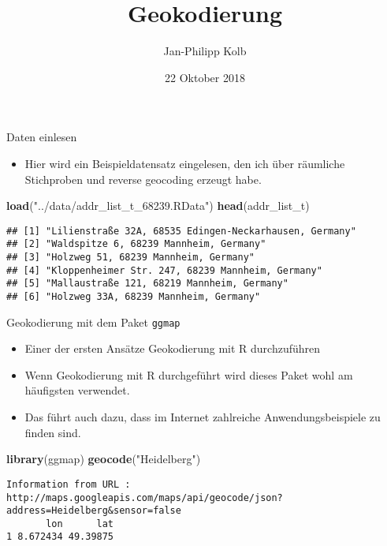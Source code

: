 \documentclass[ignorenonframetext,]{beamer}
\title{Geokodierung}
\author{Jan-Philipp Kolb}
\date{22 Oktober 2018}
\newenvironment{Shaded}{\begin{snugshade}}{\end{snugshade}}
\newcommand{\KeywordTok}[1]{\textcolor[rgb]{0.13,0.29,0.53}{\textbf{#1}}}
\newcommand{\NormalTok}[1]{#1}
\newcommand{\StringTok}[1]{\textcolor[rgb]{0.31,0.60,0.02}{#1}}
\providecommand{\tightlist}{%
  \setlength{\itemsep}{0pt}\setlength{\parskip}{0pt}}
\begin{document}
\frame{\titlepage}

\begin{frame}[fragile]{Daten einlesen}
\protect\hypertarget{daten-einlesen}{}

\begin{itemize}
\tightlist
\item
  Hier wird ein Beispieldatensatz eingelesen, den ich über räumliche
  Stichproben und reverse geocoding erzeugt habe.
\end{itemize}

\begin{Shaded}
\begin{Highlighting}[]
\KeywordTok{load}\NormalTok{(}\StringTok{"../data/addr_list_t_68239.RData"}\NormalTok{)}
\KeywordTok{head}\NormalTok{(addr_list_t)}
\end{Highlighting}
\end{Shaded}

\begin{verbatim}
## [1] "Lilienstraße 32A, 68535 Edingen-Neckarhausen, Germany"
## [2] "Waldspitze 6, 68239 Mannheim, Germany"                
## [3] "Holzweg 51, 68239 Mannheim, Germany"                  
## [4] "Kloppenheimer Str. 247, 68239 Mannheim, Germany"      
## [5] "Mallaustraße 121, 68219 Mannheim, Germany"            
## [6] "Holzweg 33A, 68239 Mannheim, Germany"
\end{verbatim}

\end{frame}

\begin{frame}[fragile]{Geokodierung mit dem Paket \texttt{ggmap}}
\protect\hypertarget{geokodierung-mit-dem-paket-ggmap}{}

\begin{itemize}
\tightlist
\item
  Einer der ersten Ansätze Geokodierung mit R durchzuführen
\item
  Wenn Geokodierung mit R durchgeführt wird dieses Paket wohl am
  häufigsten verwendet.
\item
  Das führt auch dazu, dass im Internet zahlreiche Anwendungsbeispiele
  zu finden sind.
\end{itemize}

\begin{Shaded}
\begin{Highlighting}[]
\KeywordTok{library}\NormalTok{(ggmap)}
\KeywordTok{geocode}\NormalTok{(}\StringTok{"Heidelberg"}\NormalTok{)}
\end{Highlighting}
\end{Shaded}

\begin{verbatim}
Information from URL : http://maps.googleapis.com/maps/api/geocode/json?address=Heidelberg&sensor=false
       lon      lat
1 8.672434 49.39875
\end{verbatim}

\end{frame}
\end{document}
